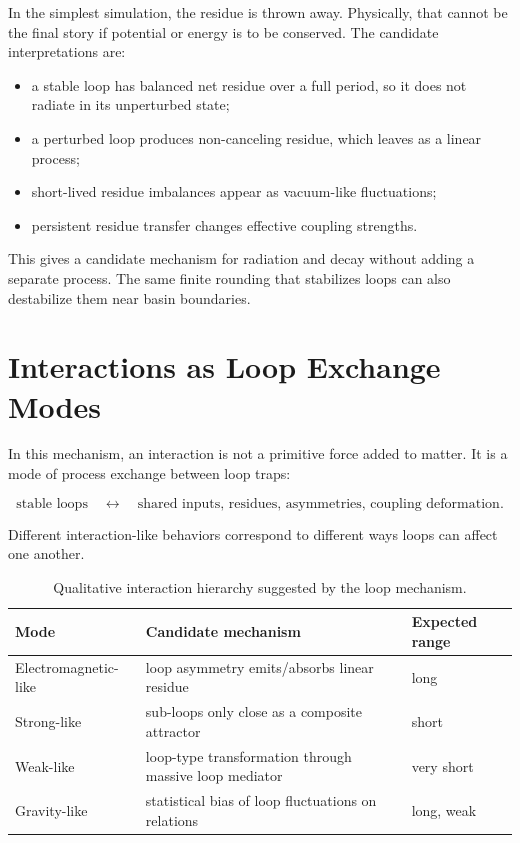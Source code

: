\documentclass[11pt,a4paper]{article}
\begin{document}
In the simplest simulation, the residue is thrown away. Physically, that
cannot be the final story if potential or energy is to be conserved. The
candidate interpretations are:

\begin{itemize}
\item a stable loop has balanced net residue over a full period, so it does
not radiate in its unperturbed state;
\item a perturbed loop produces non-canceling residue, which leaves as a
linear process;
\item short-lived residue imbalances appear as vacuum-like fluctuations;
\item persistent residue transfer changes effective coupling strengths.
\end{itemize}

This gives a candidate mechanism for radiation and decay without adding a
separate process. The same finite rounding that stabilizes loops can also
destabilize them near basin boundaries.

\section{Interactions as Loop Exchange Modes}

In this mechanism, an interaction is not a primitive force added to matter. It
is a mode of process exchange between loop traps:

\[
\text{stable loops}
\quad \longleftrightarrow \quad
\text{shared inputs, residues, asymmetries, coupling deformation}.
\]

Different interaction-like behaviors correspond to different ways loops can
affect one another.

\begin{table}[htbp]
\centering
\caption{Qualitative interaction hierarchy suggested by the loop mechanism.}
\begin{tabular}{lll}
\toprule
Mode & Candidate mechanism & Expected range\\
\midrule
Electromagnetic-like & loop asymmetry emits/absorbs linear residue & long\\
Strong-like & sub-loops only close as a composite attractor & short\\
Weak-like & loop-type transformation through massive loop mediator & very short\\
Gravity-like & statistical bias of loop fluctuations on relations & long, weak\\
\bottomrule
\end{tabular}
\label{tab:interaction_hierarchy}
\end{table}
\end{document}
